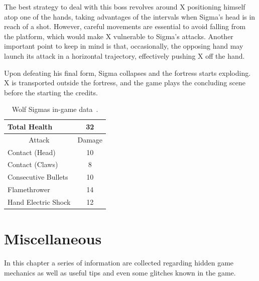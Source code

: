 The best strategy to deal with this boss  revolves around X positioning himself atop one of the hands, taking advantages of the intervals when  Sigma's head is in reach of a shot. However, careful movements are essential to avoid falling from the platform, which would make X vulnerable to Sigma's attacks. Another important point to keep in mind is that, occasionally, the opposing hand may launch its attack in a horizontal trajectory, effectively pushing X off the hand.


Upon defeating his final form, Sigma collapses and the fortress starts exploding. X is transported outside the fortress, and the game plays the concluding scene before the starting the credits.

\begin{table}[htp]
	\centering
	\begin{tabular}[h]{l c}
		\toprule
		Total Health  & 32\\
		\midrule
		\multicolumn{1}{c}{Attack} & \multicolumn{1}{c}{Damage}\\
		Contact (Head) & 10\\
		Contact (Claws) & 8\\
		Consecutive Bullets & 10\\
		Flamethrower & 14\\
		Hand Electric Shock& 12\\
		\bottomrule
	\end{tabular}
	\caption{Wolf Sigmas in-game data~\cite{wiki:Sigma,book:Compendium}.}
\end{table}

\chapter{Miscellaneous}\label{X1:misc} %
In this chapter a series of information are collected regarding hidden game mechanics as well as useful tips and even some glitches known in the game.

